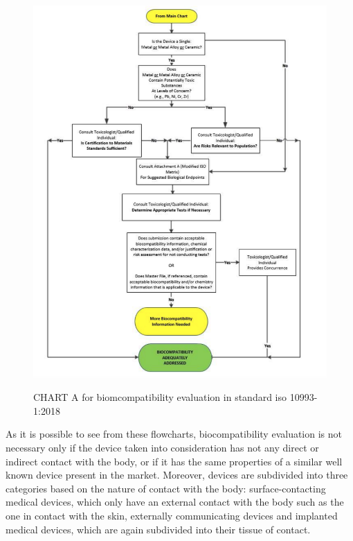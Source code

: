 \documentclass{Configuration_Files/PoliMi3i_thesis}
\begin{document}
\begin{figure}[H]

	\includegraphics[scale=0.25]{figure2_fda.png}
	\centering
    \label{fda_2}
    \caption{CHART A for biomcompatibility evaluation in standard iso 10993-1:2018 \cite{healthUseInternationalStandard2023}}
\end{figure}


As it is possible to see from these flowcharts, biocompatibility evaluation is not necessary only if the device taken into consideration has not any direct or indirect contact with the body, or if it has the same properties of a similar well known device present in the market.
Moreover, devices are subdivided into three categories based on the nature of contact with the body: surface-contacting medical devices, which only have an external contact with the body such as the one in contact with the skin, externally communicating devices and implanted medical devices, which are again subdivided into their tissue of contact.
\end{document}
